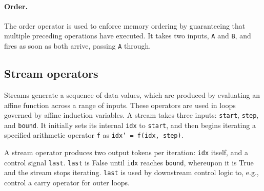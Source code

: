 \paragraph{Order.}
The order operator is used to enforce memory ordering by guaranteeing that multiple preceding operations have executed.
% 
It takes two inputs, {\tt A} and {\tt B}, and fires as soon as both arrive, passing {\tt A} through.

\subsection{Stream operators}
\label{cf:streams}
Streams generate a sequence of data values, which are 
produced by evaluating an affine function
across a range of inputs. 
%
These operators are used in loops
governed by affine induction variables.
%
A stream takes three inputs: {\tt start}, {\tt step}, and {\tt bound}.
It initially sets its internal {\tt idx} to {\tt start},
%
and then begins iterating a specified arithmetic operator {\tt f}
as {\tt idx' = f(idx, step)}.

A stream operator produces two output tokens per iteration: {\tt idx} itself,
and a control signal {\tt last}.
%
{\tt last} is False until {\tt idx} reaches {\tt bound},
whereupon it is True and the stream stops iterating.
%
{\tt last} is used by downstream control logic to, e.g., control
a carry operator for outer loops.
